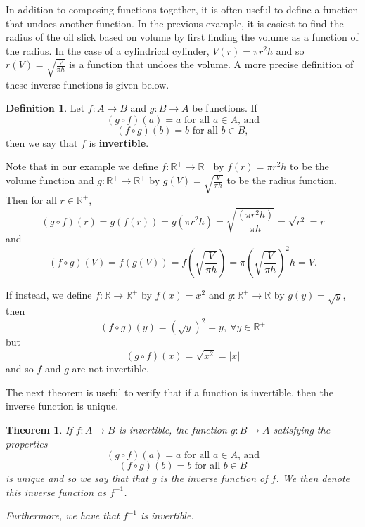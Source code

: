 \documentclass[
]{book}
\newtheorem{theorem}{Theorem}[chapter]
\theoremstyle{definition}
\newtheorem{definition}{Definition}[chapter]
\theoremstyle{definition}
\theoremstyle{definition}
\theoremstyle{remark}
\begin{document}
In addition to composing functions together, it is often useful to define a function that undoes another function. In the previous example, it is easiest to find the radius of the oil slick based on volume by first finding the volume as a function of the radius. In the case of a cylindrical cylinder, \(V(r)= \pi r^2 h\) and so \(r(V)=\sqrt{\frac{V}{\pi h}}\) is a function that undoes the volume. A more precise definition of these inverse functions is given below.

\begin{definition}
\protect\hypertarget{def:unnamed-chunk-140}{}{\label{def:unnamed-chunk-140} }Let \(f:A \rightarrow B\) and \(g:B \rightarrow A\) be functions. If
\[(g\circ f) (a)=a \mbox{ for all } a\in A \mbox{, and}\]
\[(f\circ g) (b)=b \mbox{ for all }b\in B,\] then we say that \(f\) is \textbf{invertible}.
\end{definition}

Note that in our example we define \(f:\mathbb{R}^+\rightarrow \mathbb{R}^+\) by \(f(r)= \pi r^2 h\) to be the volume function and \(g:\mathbb{R}^+\rightarrow \mathbb{R}^+\) by \(g(V)=\sqrt{\frac{V}{\pi h}}\) to be the radius function. Then for all \(r\in \mathbb{R}^+\),
\[(g\circ f) (r) = g (f(r)) = g\left(\pi r^2 h\right) = \sqrt{ \frac{\left(\pi r^2 h\right)}{\pi h}} = \sqrt{r^2}=r\] and
\[(f \circ g) (V) = f(g(V)) = f\left(\sqrt{\frac{V}{\pi h}}\right) = \pi \left(\sqrt{\frac{V}{\pi h}}\right)^2 h = V.\]

If instead, we define \(f:\mathbb{R}\rightarrow \mathbb{R}^+\) by \(f(x)=x^2\) and \(g:\mathbb{R^+} \rightarrow \mathbb{R}\) by \(g(y)=\sqrt{y}\), then \[(f\circ g) (y) =\left(\sqrt{y}\right)^2 =y, \: \forall y\in \mathbb{R}^+\] but \[(g\circ f)(x) = \sqrt{x^2} = |x|\] and so \(f\) and \(g\) are not invertible.

The next theorem is useful to verify that if a function is invertible, then the inverse function is unique.

\begin{theorem}
\protect\hypertarget{thm:invertible}{}{\label{thm:invertible} }If \(f:A \rightarrow B\) is invertible, the function \(g:B\rightarrow A\) satisfying the properties
\[(g\circ f) (a)=a \mbox{ for all } a\in A \mbox{, and}\]
\[(f\circ g) (b)=b \mbox{ for all }b\in B\]
is unique and so we say that that \(g\) is the inverse function of \(f\). We then denote this inverse function as \(f^{-1}\).

Furthermore, we have that \(f^{-1}\) is invertible.
\end{theorem}
\end{document}
